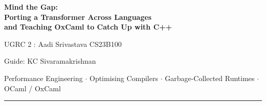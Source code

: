 \documentclass[11pt,a4paper]{article}
\begin{document}
\begin{titlepage}
  \centering
  \vspace*{4cm}
  {\color{ugblue}\Huge\bfseries Mind the Gap:\\[0.3em]
   Porting a Transformer Across Languages\\[0.3em]
   and Teaching OxCaml to Catch Up with C++\par}
  \vspace{1.6cm}
  {\large UGRC 2 : Aadi Srivastava CS23B100\par}
  \vspace{0.4cm}
  {\large Guide: KC Sivaramakrishnan\par}
  \vspace{0.6cm}
  {\color{uggrey}\small Performance Engineering $\cdot$ Optimising Compilers $\cdot$
    Garbage-Collected Runtimes $\cdot$ OCaml / OxCaml\par}
  \vspace{2.5cm}
  \rule{0.45\textwidth}{0.4pt}
  \vfill
\end{titlepage}

\tableofcontents
\clearpage



















\clearpage
{}
{}


\end{document}

